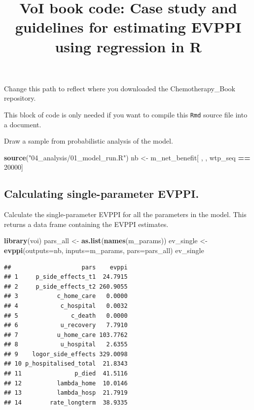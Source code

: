 \documentclass[
]{article}
\title{VoI book code: Case study and guidelines for estimating EVPPI
using regression in R}
\author{}
\date{\vspace{-2.5em}}
\newenvironment{Shaded}{\begin{snugshade}}{\end{snugshade}}
\newcommand{\AttributeTok}[1]{\textcolor[rgb]{0.13,0.29,0.53}{#1}}
\newcommand{\DecValTok}[1]{\textcolor[rgb]{0.00,0.00,0.81}{#1}}
\newcommand{\FunctionTok}[1]{\textcolor[rgb]{0.13,0.29,0.53}{\textbf{#1}}}
\newcommand{\NormalTok}[1]{#1}
\newcommand{\OtherTok}[1]{\textcolor[rgb]{0.56,0.35,0.01}{#1}}
\newcommand{\SpecialCharTok}[1]{\textcolor[rgb]{0.81,0.36,0.00}{\textbf{#1}}}
\newcommand{\StringTok}[1]{\textcolor[rgb]{0.31,0.60,0.02}{#1}}
\begin{document}
\maketitle

Change this path to reflect where you downloaded the Chemotherapy\_Book
repository.

This block of code is only needed if you want to compile this
\texttt{Rmd} source file into a document.

Draw a sample from probabilistic analysis of the model.

\begin{Shaded}
\begin{Highlighting}[]
\FunctionTok{source}\NormalTok{(}\StringTok{"04\_analysis/01\_model\_run.R"}\NormalTok{)}
\NormalTok{nb }\OtherTok{\textless{}{-}}\NormalTok{ m\_net\_benefit[ , , wtp\_seq }\SpecialCharTok{==} \DecValTok{20000}\NormalTok{]}
\end{Highlighting}
\end{Shaded}

\hypertarget{calculating-single-parameter-evppi.}{%
\subsection{Calculating single-parameter
EVPPI.}\label{calculating-single-parameter-evppi.}}

Calculate the single-parameter EVPPI for all the parameters in the
model. This returns a data frame containing the EVPPI estimates.

\begin{Shaded}
\begin{Highlighting}[]
\FunctionTok{library}\NormalTok{(voi)}
\NormalTok{pars\_all }\OtherTok{\textless{}{-}} \FunctionTok{as.list}\NormalTok{(}\FunctionTok{names}\NormalTok{(m\_params))}
\NormalTok{ev\_single }\OtherTok{\textless{}{-}} \FunctionTok{evppi}\NormalTok{(}\AttributeTok{outputs=}\NormalTok{nb, }\AttributeTok{inputs=}\NormalTok{m\_params, }\AttributeTok{pars=}\NormalTok{pars\_all)}
\NormalTok{ev\_single}
\end{Highlighting}
\end{Shaded}

\begin{verbatim}
##                    pars    evppi
## 1     p_side_effects_t1  24.7915
## 2     p_side_effects_t2 260.9055
## 3           c_home_care   0.0000
## 4            c_hospital   0.0032
## 5               c_death   0.0000
## 6            u_recovery   7.7910
## 7           u_home_care 103.7762
## 8            u_hospital   2.6355
## 9    logor_side_effects 329.0098
## 10 p_hospitalised_total  21.8343
## 11               p_died  41.5116
## 12          lambda_home  10.0146
## 13          lambda_hosp  21.7919
## 14        rate_longterm  38.9335
\end{verbatim}
\end{document}
